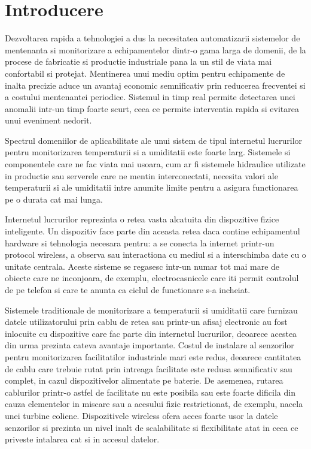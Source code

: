 \chapter{Introducere}\label{ch:intro}
\pagestyle{fancy}
Dezvoltarea rapida a tehnologiei a dus la necesitatea automatizarii sistemelor de mentenanta si monitorizare a echipamentelor dintr-o gama larga de 
domenii, de la procese de fabricatie si productie industriale pana la un stil de viata mai confortabil si protejat. Mentinerea unui mediu optim pentru
echipamente de inalta precizie aduce un avantaj economic semnificativ prin reducerea frecventei si a costului mentenantei periodice. Sistemul in timp
real permite detectarea unei anomalii intr-un timp foarte scurt, ceea ce permite interventia rapida si evitarea unui eveniment nedorit.

Spectrul domeniilor de aplicabilitate ale unui sistem de tipul internetul lucrurilor pentru monitorizarea temperaturii si a umiditatii este foarte 
larg. Sistemele si componentele care ne fac viata mai usoara, cum ar fi sistemele hidraulice utilizate in productie sau serverele care ne mentin 
interconectati, necesita valori ale temperaturii si ale umiditatii intre anumite limite pentru a asigura functionarea pe o durata cat mai lunga.

Internetul lucrurilor reprezinta o retea vasta alcatuita din dispozitive fizice inteligente. Un dispozitiv face parte din aceasta retea daca contine
echipamentul hardware si tehnologia necesara pentru: a se conecta la internet printr-un protocol wireless, a observa sau interactiona cu mediul si
a interschimba date cu o unitate centrala. Aceste sisteme se regasesc intr-un numar tot mai mare de obiecte care ne inconjoara, de exemplu,
electrocasnicele care iti permit controlul de pe telefon si care te anunta ca ciclul de functionare s-a incheiat.

Sistemele traditionale de monitorizare a temperaturii si umiditatii care furnizau datele utilizatorului prin cablu de retea sau printr-un afisaj
electronic au fost inlocuite cu dispozitive care fac parte din internetul lucrurilor, deoarece acestea din urma prezinta cateva avantaje importante.
Costul de instalare al senzorilor pentru monitorizarea facilitatilor industriale mari este redus, deoarece cantitatea de cablu care trebuie
rutat prin intreaga facilitate este redusa semnificativ sau complet, in cazul dispozitivelor alimentate pe baterie. De asemenea, rutarea cablurilor 
printr-o astfel de facilitate nu este posibila sau este foarte dificila din cauza elementelor in miscare sau a acesului fizic restrictionat, de exemplu,
nacela unei turbine eoliene. Dispozitivele wireless ofera acces foarte usor la datele senzorilor si prezinta un nivel inalt de scalabilitate si 
flexibilitate atat in ceea ce priveste intalarea cat si in accesul datelor.

